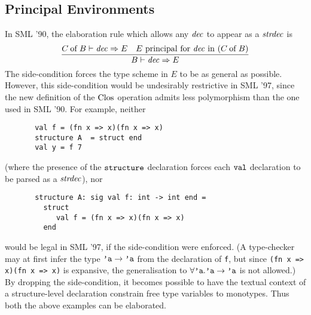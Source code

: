 %
%
\subsection{Principal Environments}
\label{prinenv}
In SML '90, the elaboration rule which allows any ${\it dec}$ to
appear as a ${\it strdec}$ is
$$
\frac{ C \mathbin{\rm of} B\vdash{\it dec}\Rightarrow E
       \quad E\ {\rm principal\ for\ {\it dec}\ in\ } (C \mathbin{\rm of} B)
}
     { B\vdash{\it dec}\Rightarrow E }
$$
The side-condition forces the type scheme in $E$ to be as general
as possible. However, this side-condition would be undesirably 
restrictive in SML '97, since the new definition of the ${\rm Clos}_{}$ 
operation admits less polymorphism than the one used in SML '90.
For example, neither
\begin{verbatim}
       val f = (fn x => x)(fn x => x)
       structure A  = struct end
       val y = f 7
\end{verbatim}
(where the presence of the ${\tt structure}$ declaration forces each ${\tt val}$
declaration to be parsed as a ${\it strdec}$),
nor
\begin{verbatim}
       structure A: sig val f: int -> int end = 
         struct
            val f = (fn x => x)(fn x => x)
         end
\end{verbatim}
would be legal in SML '97, if the side-condition were enforced.
(A type-checker may at first infer the type $\hbox{\tt 'a}\to\hbox{\tt 'a}$ from 
the declaration of {\tt f}, but since {\tt (fn x => x)(fn x => x)}
is expansive, the generalisation to $\forall\hbox{\tt 'a}.\hbox{\tt 'a}\to\hbox{\tt 'a}$
is not allowed.) By dropping the side-condition, it becomes possible
to have the textual context of a structure-level declaration constrain
free type variables to monotypes. Thus both the above examples can
be elaborated. 


